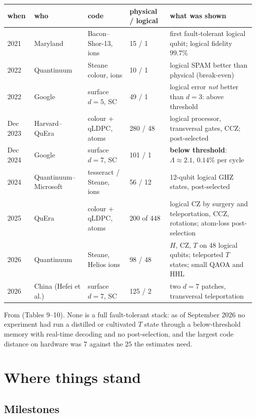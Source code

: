 \begin{center}\footnotesize
\renewcommand{\arraystretch}{1.12}
\begin{tabular}{@{}llp{2.8cm}lp{5.2cm}@{}}
\toprule
when & who & code & physical / logical & what was shown\\
\midrule
2021 & Maryland & Bacon--Shor-13, ions & 15 / 1 & first fault-tolerant logical qubit; logical fidelity $99.7\%$\\
2022 & Quantinuum & Steane colour, ions & 10 / 1 & logical SPAM better than physical (break-even)\\
2022 & Google & surface $d=5$, SC & 49 / 1 & logical error \emph{not} better than $d=3$: above threshold\\
Dec 2023 & Harvard--QuEra & colour + qLDPC, atoms & 280 / 48 & logical processor, transversal gates, CCZ; post-selected\\
Dec 2024 & Google & surface $d=7$, SC & 101 / 1 & \textbf{below threshold}: $\Lambda\approx2.1$, $0.14\%$ per cycle\\
2024 & Quantinuum--Microsoft & tesseract / Steane, ions & 56 / 12 & 12-qubit logical GHZ states, post-selected\\
2025 & QuEra & colour + qLDPC, atoms & 200 of 448 & logical CZ by surgery and teleportation, CCZ, rotations; atom-loss post-selection\\
2026 & Quantinuum & Steane, Helios ions & 98 / 48 & $H$, CZ, $T$ on 48 logical qubits; teleported $T$ states; small QAOA and HHL\\
2026 & China (Hefei et al.) & surface $d=7$, SC & 125 / 2 & two $d=7$ patches, transversal teleportation\\
\bottomrule
\end{tabular}
\end{center}
\noindent From \cite{ph:uqt26} (Tables 9--10). None is a full fault-tolerant stack: as of
September 2026 no experiment had run a distilled or cultivated $T$ state through a below-threshold
memory with real-time decoding and no post-selection, and the largest code distance on hardware
was $7$ against the $25$ the estimates need.

\section{Where things stand}\label{ph:sec:landscape}

\subsection{Milestones}


